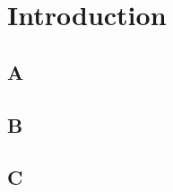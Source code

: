 \chapter{Introduction}\label{ch:introduction}

\section{A}\label{sec:A}


\section{B}\label{sec:B}


\section{C}\label{sec:C}